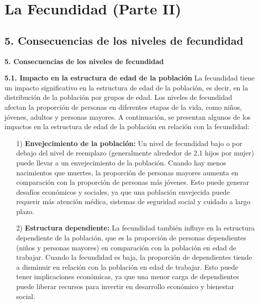 \documentclass[8pt,a4paper]{beamer}
\begin{document}
{\section{La Fecundidad (Parte II)}
\subsection{5. Consecuencias de los niveles de fecundidad}
\begin{frame}{\textbf{5. Consecuencias de los niveles de fecundidad}}
\setlength{\parskip}{3px}
\justifying
\begin{block}{\textbf{5.1. Impacto en la estructura de edad de la población}}
\setlength{\parskip}{3px}
\justifying
La fecundidad tiene un impacto significativo en la estructura de edad de la población, es decir, en la distribución de la población por grupos de edad. Los niveles de fecundidad afectan la proporción de personas en diferentes etapas de la vida, como niños, jóvenes, adultos y personas mayores. A continuación, se presentan algunos de los impactos en la estructura de edad de la población en relación con la fecundidad:

\begin{enumerate}
\setlength{\parskip}{3px}
\justifying
\item[1)] \textbf{Envejecimiento de la población:} Un nivel de fecundidad bajo o por debajo del nivel de reemplazo (generalmente alrededor de 2,1 hijos por mujer) puede llevar a un envejecimiento de la población. Cuando hay menos nacimientos que muertes, la proporción de personas mayores aumenta en comparación con la proporción de personas más jóvenes. Esto puede generar desafíos económicos y sociales, ya que una población envejecida puede requerir más atención médica, sistemas de seguridad social y cuidado a largo plazo.
\end{enumerate}
\end{block}
\end{frame}

\begin{frame}{}
\begin{block}{}
\setlength{\parskip}{3px}
\justifying
\begin{enumerate}
\setlength{\parskip}{3px}
\justifying
\item[2)] \textbf{Estructura dependiente:} La fecundidad también influye en la estructura dependiente de la población, que es la proporción de personas dependientes (niños y personas mayores) en comparación con la población en edad de trabajar. Cuando la fecundidad es baja, la proporción de dependientes tiende a disminuir en relación con la población en edad de trabajar. Esto puede tener implicaciones económicas, ya que una menor carga de dependientes puede liberar recursos para invertir en desarrollo económico y bienestar social.


\end{enumerate}
\end{block}
\end{frame}}
\end{document}
